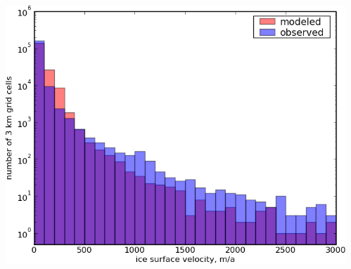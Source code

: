 \documentclass{beamer}
\begin{document}
\begin{frame}
\begin{columns}
\begin{column}{0.33\textwidth}
\begin{center}
\end{center}
\end{column}
\begin{column}{0.33\textwidth}
\begin{center}
  \includegraphics[width=1.0\textwidth]{g3km_5_25_98_hist}
\end{center}
\end{column}
\end{columns}
\end{frame}
\end{document}
